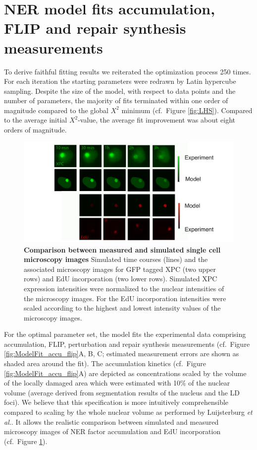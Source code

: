 \section{NER model fits accumulation, FLIP and repair synthesis measurements}    

To derive faithful fitting results we reiterated the optimization process 250 times. For each iteration the starting parameters were redrawn by Latin hypercube sampling. Despite the size of the model, with respect to data points and the number of parameters, the majority of fits terminated within one order of magnitude compared to the global $X^2$ minimum (cf.\ Figure \ref{fig:LHS}). Compared to the average initial $X^2$-value, the average fit improvement was about eight orders of magnitude.
\begin{figure}[b!]
\begin{center}
\includegraphics[width=1\textwidth]{Abbildungen/figure2_6_2.pdf}
\caption{\textbf{Comparison between measured and simulated single cell microscopy images} Simulated time courses (lines) and the associated microscopy images for GFP tagged XPC (two upper rows) and EdU incorporation (two lower rows). Simulated XPC expression intensities were normalized to the nuclear intensities of the microscopy images. For the EdU incorporation intensities were scaled according to the highest and lowest intensity values of the microscopy images.}
\label{fig:Fitt_accu_Mic}
\end{center}
\end{figure}
For the optimal parameter set, the model fits the experimental data comprising accumulation, FLIP, perturbation and repair synthesis measurements (cf.\ Figure \ref{fig:ModelFit_accu_flip}A, B, C; estimated measurement errors are shown as shaded area around the fit). The accumulation kinetics (cf.\ Figure \ref{fig:ModelFit_accu_flip}A) are depicted as concentrations scaled by the volume of the locally damaged area which were estimated with 10\% of the nuclear volume (average derived from segmentation results of the nucleus and the LD foci). We believe that this specification is more intuitively comprehensible  compared to scaling by the whole nuclear volume as performed by Luijsterburg \textit{et al.}\cite{Luijsterburg2010}. It allows the realistic comparison between simulated and measured microscopy images of NER factor accumulation and EdU incorporation (cf.\ Figure \ref{fig:Fitt_accu_Mic}).  



